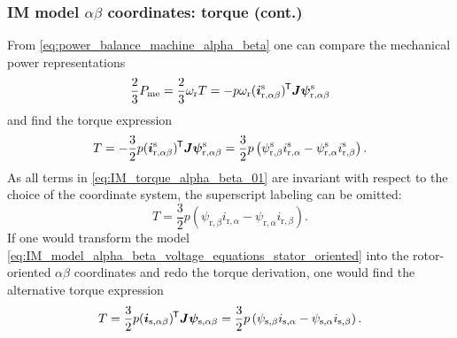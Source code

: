 \begin{frame}
	\frametitle{IM model $\alpha\beta$ coordinates: torque (cont.)}
    From \eqref{eq:power_balance_machine_alpha_beta} one can compare the mechanical power representations
    \begin{equation}
        \frac{2}{3}P_\mathrm{me} = \frac{2}{3} \omega_\mathrm{r} T = -p\omega_\mathrm{r}(\bm{i}^\mathrm{s}_\mathrm{r,\alpha\beta})^{\mkern-1.5mu\mathsf{T}}\bm{J}\bm{\psi}^\mathrm{s}_\mathrm{r,\alpha\beta}
    \end{equation}
    and find the torque expression
    \begin{equation}
        T = -\frac{3}{2} p (\bm{i}^\mathrm{s}_\mathrm{r,\alpha\beta})^{\mkern-1.5mu\mathsf{T}}\bm{J}\bm{\psi}^\mathrm{s}_\mathrm{r,\alpha\beta} = \frac{3}{2} p \left(\psi_{\mathrm{r},\beta}^\mathrm{s} i_{\mathrm{r},\alpha}^\mathrm{s} - \psi_{\mathrm{r},\alpha}^\mathrm{s}i_{\mathrm{r},\beta}^\mathrm{s}\right).
        \label{eq:IM_torque_alpha_beta_01}
    \end{equation}
    As all terms in \eqref{eq:IM_torque_alpha_beta_01} are invariant with respect to the choice of the coordinate system, the superscript labeling can be omitted:
    \begin{equation}
        T = \frac{3}{2} p \left(\psi_{\mathrm{r},\beta} i_{\mathrm{r},\alpha} - \psi_{\mathrm{r},\alpha}i_{\mathrm{r},\beta}\right).
        \label{eq:IM_torque_alpha_beta_02}
    \end{equation}
    If one would transform the model \eqref{eq:IM_model_alpha_beta_voltage_equations_stator_oriented} into the rotor-oriented $\alpha\beta$ coordinates and redo the torque derivation, one would find the alternative torque expression
    \begin{equation}
        T = \frac{3}{2} p (\bm{i}_\mathrm{s,\alpha\beta})^{\mkern-1.5mu\mathsf{T}}\bm{J}\bm{\psi}_\mathrm{s,\alpha\beta} = \frac{3}{2} p \left(\psi_{\mathrm{s},\beta} i_{\mathrm{s},\alpha} - \psi_{\mathrm{s},\alpha}i_{\mathrm{s},\beta}\right).
    \end{equation}
\end{frame}

